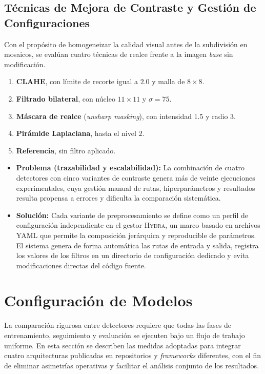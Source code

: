 \subsection{Técnicas de Mejora de Contraste y Gestión de Configuraciones}\label{ssec:contraste}

Con el propósito de homogeneizar la calidad visual antes de la subdivisión en mosaicos, se evalúan cuatro técnicas de realce frente a la imagen \emph{base} sin modificación.
\begin{enumerate}
  \renewcommand{\labelenumi}{\alph{enumi})}
  \renewcommand{\theenumi}{\alph{enumi}}
  \item \textbf{CLAHE}, con límite de recorte igual a \(2.0\) y malla de \(8\times8\).
  \item \textbf{Filtrado bilateral}, con núcleo \(11\times11\) y \(\sigma = 75\).
  \item \textbf{Máscara de realce} (\emph{unsharp masking}), con intensidad \(1.5\) y radio \(3\).
  \item \textbf{Pirámide Laplaciana}, hasta el nivel \(2\).
  \item \textbf{Referencia}, sin filtro aplicado.
\end{enumerate}

\begin{itemize}
  \item \textbf{Problema (trazabilidad y escalabilidad):}
        La combinación de cuatro detectores con cinco variantes de contraste genera más de veinte ejecuciones experimentales, cuya gestión manual de rutas, hiperparámetros y resultados resulta propensa a errores y dificulta la comparación sistemática.
  \item \textbf{Solución:}
        Cada variante de preprocesamiento se define como un perfil de configuración independiente en el gestor \textsc{Hydra}, un marco basado en archivos YAML que permite la composición jerárquica y reproducible de parámetros.
        El sistema genera de forma automática las rutas de entrada y salida, registra los valores de los filtros en un directorio de configuración dedicado y evita modificaciones directas del código fuente.
\end{itemize}

\section{Configuración de Modelos}\label{sec:modelos}

La comparación rigurosa entre detectores requiere que todas las fases de entrenamiento, seguimiento y evaluación se ejecuten bajo un flujo de trabajo uniforme.
En esta sección se describen las medidas adoptadas para integrar cuatro arquitecturas publicadas en repositorios y \emph{frameworks} diferentes, con el fin de eliminar asimetrías operativas y facilitar el análisis conjunto de los resultados.

